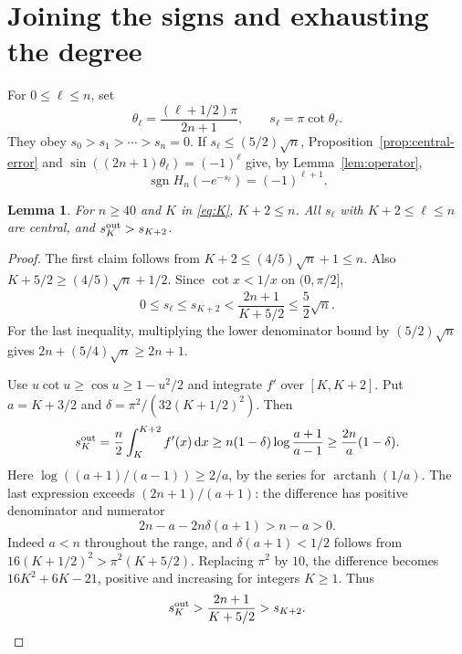 \documentclass[11pt,letterpaper]{article}
\numberwithin{equation}{section}
\newtheorem{lemma}[theorem]{Lemma}
\newcommand{\sgn}{\operatorname{sgn}}
\newcommand{\dd}{\,\mathrm d}
\begin{document}
\section{Joining the signs and exhausting the degree}\label{sec:join}
For $0\le\ell\le n$, set
\begin{equation}\label{eq:central-samples}
 \theta_\ell=\frac{(\ell+1/2)\pi}{2n+1},\qquad s_\ell=\pi\cot\theta_\ell.
\end{equation}
They obey $s_0>s_1>\cdots>s_n=0$. If $s_\ell\le(5/2)\sqrt n$, Proposition~\ref{prop:central-error} and $\sin((2n+1)\theta_\ell)=(-1)^\ell$ give, by Lemma~\ref{lem:operator},
\begin{equation}\label{eq:central-sign}\sgn H_n(-e^{-s_\ell})=(-1)^{\ell+1}.\end{equation}
\begin{lemma}\label{lem:join}
For $n\ge40$ and $K$ in \eqref{eq:K}, $K+2\le n$. All $s_\ell$ with $K+2\le\ell\le n$ are central, and $s_K^{\rm out}>s_{K+2}$.
\end{lemma}
\begin{proof}
The first claim follows from $K+2\le(4/5)\sqrt n+1\le n$. Also $K+5/2\ge(4/5)\sqrt n+1/2$. Since $\cot x<1/x$ on $(0,\pi/2]$,
\[
 0\le s_\ell\le s_{K+2}<\frac{2n+1}{K+5/2}\le\frac52\sqrt n.
\]
For the last inequality, multiplying the lower denominator bound by $(5/2)\sqrt n$ gives $2n+(5/4)\sqrt n\ge2n+1$.

Use $u\cot u\ge\cos u\ge1-u^2/2$ and integrate $f'$ over $[K,K+2]$. Put $a=K+3/2$ and $\delta=\pi^2/(32(K+1/2)^2)$. Then
\[
 s_K^{\rm out}=\frac n2\int_K^{K+2}f'(x)\dd x
 \ge n(1-\delta)\log\frac{a+1}{a-1}
 \ge\frac{2n}{a}(1-\delta).
\]
Here $\log((a+1)/(a-1))\ge2/a$, by the series for $\operatorname{arctanh}(1/a)$. The last expression exceeds $(2n+1)/(a+1)$: the difference has positive denominator and numerator
\[
 2n-a-2n\delta(a+1)>n-a>0.
\]
Indeed $a<n$ throughout the range, and $\delta(a+1)<1/2$ follows from
$16(K+1/2)^2>\pi^2(K+5/2)$. Replacing $\pi^2$ by $10$, the difference becomes $16K^2+6K-21$, positive and increasing for integers $K\ge1$. Thus
\[
 s_K^{\rm out}>\frac{2n+1}{K+5/2}>s_{K+2}.
\]
\end{proof}
\end{document}
